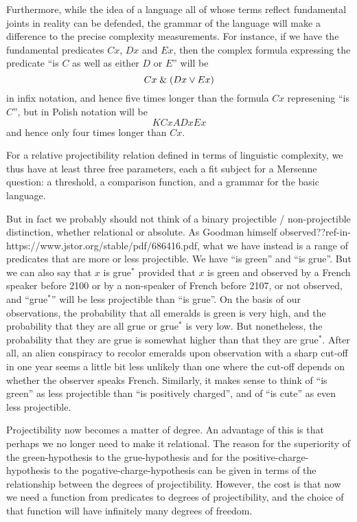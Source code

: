 Furthermore, while the idea of a language all of whose terms reflect fundamental joints in reality can be defended, the grammar
of the language will make a difference to the precise complexity measurements. For instance, if we have the fundamental predicates 
$Cx$, $Dx$ and $Ex$, then the complex formula expressing the predicate ``is $C$ as well as either $D$ or $E$'' will be 
$$
    Cx \mathrel{\&} (Dx \vee Ex)
$$    
    in infix notation, and hence five times longer than the formula $Cx$ represening ``is $C$'', but in Polish notation 
    will be 
$$
    KCxADxEx
$$    
and hence only four times longer than $Cx$.

For a relative projectibility relation defined in terms of linguistic complexity, we thus have at least three free parameters,
each a fit subject for a Mersenne question: a threshold, a comparison function, and a grammar for the basic language.

But in fact we probably should not think of a binary projectible / non-projectible distinction, whether
relational or absolute. As Goodman himself observed??ref-in-https://www.jstor.org/stable/pdf/686416.pdf, what we have instead is a range of predicates that are more or less projectible. We have ``is green'' and
``is grue''. But we can also say that $x$ is grue$^*$ provided that $x$ is green and observed by a French speaker before 2100 or by a 
non-speaker of French before 2107, or not observed, and ``grue$^*$'' will be less projectible than ``is grue''. On the basis of our observations, the
probability that all emeralds is green is very high, and the probability that they are all grue or grue$^*$ is very low. But
nonetheless, the probability that they are grue is somewhat higher than that they are grue$^*$. After all, an alien conspiracy to
recolor emeralds upon observation with a sharp cut-off in one year seems a little bit less unlikely than one where the cut-off 
depends on whether the observer speaks French. Similarly, it makes sense to think of ``is green'' as less projectible than ``is positively
charged'', and of ``is cute'' as even less projectible. 

Projectibility now becomes a matter of degree. An advantage of this is that perhaps we no longer need to make it relational.
The reason for the superiority of the green-hypothesis to the grue-hypothesis and for the positive-charge-hypothesis to the
pogative-charge-hypothesis can be given in terms of the relationship between the degrees of projectibility. However, the cost
is that now we need a function from predicates to degrees of projectibility, and the choice of that function will have infinitely
many degrees of freedom.

